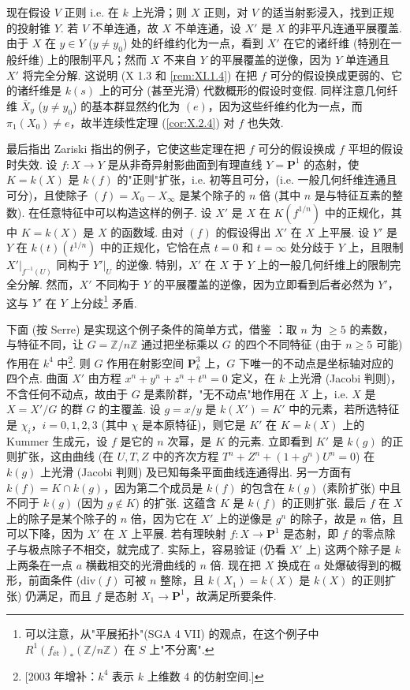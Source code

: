 现在假设 $V$ 正则 i.e. 在 $k$ 上光滑；则 $X$ 正则，对 $V$ 的适当射影浸入，找到正规的投射锥 $Y$. 若 $V$ 不单连通，故 $X$ 不单连通，设 $X'$ 是 $X$ 的非平凡连通平展覆盖. 由于 $X$ 在 $y \in Y$ ($y \neq y_0$) 处的纤维约化为一点，看到 $X'$ 在它的诸纤维 (特别在一般纤维) 上的限制平凡；然而 $X$ 不来自 $Y$ 的平展覆盖的逆像，因为 $Y$ 单连通且 $X'$ 将完全分解. 这说明 (X 1.3 和 \ref{rem:XI.1.4}) 在把 $f$ 可分的假设换成更弱的、它的诸纤维是 $k(s)$ 上的可分 (甚至光滑) 代数概形的假设时变假. 同样注意几何纤维 $\overline{X}_y$ ($y \neq y_0$) 的基本群显然约化为 $(e)$，因为这些纤维约化为一点，而 $\pi_1(X_0) \neq e$，故半连续性定理 (\cref{cor:X.2.4}) 对 $f$ 也失效.

最后指出 Zariski 指出的例子，它使这些定理在把 $f$ 可分的假设换成 $f$ 平坦的假设时失效. 设 $f \colon X \to Y$ 是从非奇异射影曲面到有理直线 $Y = \mathbf{P}^1$ 的态射，使 $K = k(X)$ 是 $k(f)$ 的"正则"扩张，i.e. 初等且可分，(i.e. 一般几何纤维连通且可分)，且使除子 $(f) = X_0 - X_\infty$ 是某个除子的 $n$ 倍 (其中 $n$ 是与特征互素的整数). 在任意特征中可以构造这样的例子. 设 $X'$ 是 $X$ 在 $K(f^{1/n})$ 中的正规化，其中 $K = k(X)$ 是 $X$ 的函数域. 由对 $(f)$ 的假设得出 $X'$ 在 $X$ 上平展. 设 $Y'$ 是 $Y$ 在 $k(t)(t^{1/n})$ 中的正规化，它恰在点 $t = 0$ 和 $t = \infty$ 处分歧于 $Y$ 上，且限制 $X'|_{f^{-1}(U)}$ 同构于 $Y'|_U$ 的逆像. 特别，$X'$ 在 $X$ 于 $Y$ 上的一般几何纤维上的限制完全分解. 然而，$X'$ 不同构于 $Y$ 的平展覆盖的逆像，因为立即看到后者必然为 $Y'$，这与 $Y'$ 在 $Y$ 上分歧\footnote{可以注意，从"平展拓扑"(SGA 4 VII) 的观点，在这个例子中 $R^1(f_{\mathrm{ét}})_*(\mathbb{Z}/n\mathbb{Z})$ 在 $S$ 上"不分离".} 矛盾.

下面 (按 Serre) 是实现这个例子条件的简单方式，借鉴 \cite[第 20 号]{exp11-5}：取 $n$ 为 $\geqslant 5$ 的素数，与特征不同，让 $G = \mathbb{Z}/n\mathbb{Z}$ 通过把坐标乘以 $G$ 的四个不同特征 (由于 $n \geqslant 5$ 可能) 作用在 $k^4$ 中\footnote{[2003 年增补：$k^4$ 表示 $k$ 上维数 4 的仿射空间.]}. 则 $G$ 作用在射影空间 $\mathbf{P}^3_k$ 上，$G$ 下唯一的不动点是坐标轴对应的四个点. 曲面 $X'$ 由方程 $x^n + y^n + z^n + t^n = 0$ 定义，在 $k$ 上光滑 (Jacobi 判则)，不含任何不动点，故由于 $G$ 是素阶群，"无不动点"地作用在 $X$ 上，i.e. $X$ 是 $X = X'/G$ 的群 $G$ 的主覆盖. 设 $g = x/y$ 是 $k(X') = K'$ 中的元素，若所选特征是 $\chi_i$，$i = 0, 1, 2, 3$ (其中 $\chi$ 是本原特征)，则它是 $K'$ 在 $K = k(X)$ 上的 Kummer 生成元，设 $f$ 是它的 $n$ 次幂，是 $K$ 的元素. 立即看到 $K'$ 是 $k(g)$ 的正则扩张，这由曲线 (在 $U, T, Z$ 中的齐次方程 $T^n + Z^n + (1 + g^n)U^n = 0$) 在 $k(g)$ 上光滑 (Jacobi 判则) 及已知每条平面曲线连通得出. 另一方面有 $k(f) = K \cap k(g)$，因为第二个成员是 $k(f)$ 的包含在 $k(g)$ (素阶扩张) 中且不同于 $k(g)$ (因为 $g \notin K$) 的扩张. 这蕴含 $K$ 是 $k(f)$ 的正则扩张. 最后 $f$ 在 $X$ 上的除子是某个除子的 $n$ 倍，因为它在 $X'$ 上的逆像是 $g^n$ 的除子，故是 $n$ 倍，且可以下降，因为 $X'$ 在 $X$ 上平展. 若有理映射 $f \colon X \to \mathbf{P}^1$ 是态射，即 $f$ 的零点除子与极点除子不相交，就完成了. 实际上，容易验证 (仍看 $X'$ 上) 这两个除子是 $k$ 上两条在一点 $a$ 横截相交的光滑曲线的 $n$ 倍. 现在把 $X$ 换成在 $a$ 处爆破得到的概形，前面条件 ($\mathrm{div}(f)$ 可被 $n$ 整除，且 $k(X_1) = k(X)$ 是 $k(X)$ 的正则扩张) 仍满足，而且 $f$ 是态射 $X_1 \to \mathbf{P}^1$，故满足所要条件.

